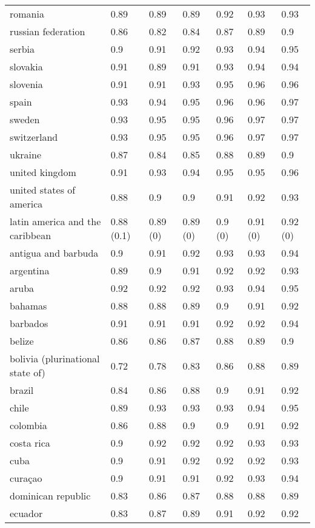 \begin{longtable}[t]{lllllll}
romania & 0.89 & 0.89 & 0.89 & 0.92 & 0.93 & 0.93\\
russian federation & 0.86 & 0.82 & 0.84 & 0.87 & 0.89 & 0.9\\
serbia & 0.9 & 0.91 & 0.92 & 0.93 & 0.94 & 0.95\\
slovakia & 0.91 & 0.89 & 0.91 & 0.93 & 0.94 & 0.94\\
slovenia & 0.91 & 0.91 & 0.93 & 0.95 & 0.96 & 0.96\\
\addlinespace
spain & 0.93 & 0.94 & 0.95 & 0.96 & 0.96 & 0.97\\
sweden & 0.93 & 0.95 & 0.95 & 0.96 & 0.97 & 0.97\\
switzerland & 0.93 & 0.95 & 0.95 & 0.96 & 0.97 & 0.97\\
ukraine & 0.87 & 0.84 & 0.85 & 0.88 & 0.89 & 0.9\\
united kingdom & 0.91 & 0.93 & 0.94 & 0.95 & 0.95 & 0.96\\
\addlinespace
united states of america & 0.88 & 0.9 & 0.9 & 0.91 & 0.92 & 0.93\\
latin america and the caribbean & 0.88 (0.1) & 0.89 (0) & 0.89 (0) & 0.9 (0) & 0.91 (0) & 0.92 (0)\\
antigua and barbuda & 0.9 & 0.91 & 0.92 & 0.93 & 0.93 & 0.94\\
argentina & 0.89 & 0.9 & 0.91 & 0.92 & 0.92 & 0.93\\
aruba & 0.92 & 0.92 & 0.92 & 0.93 & 0.94 & 0.95\\
\addlinespace
bahamas & 0.88 & 0.88 & 0.89 & 0.9 & 0.91 & 0.92\\
barbados & 0.91 & 0.91 & 0.91 & 0.92 & 0.92 & 0.94\\
belize & 0.86 & 0.86 & 0.87 & 0.88 & 0.89 & 0.9\\
bolivia (plurinational state of) & 0.72 & 0.78 & 0.83 & 0.86 & 0.88 & 0.89\\
brazil & 0.84 & 0.86 & 0.88 & 0.9 & 0.91 & 0.92\\
\addlinespace
chile & 0.89 & 0.93 & 0.93 & 0.93 & 0.94 & 0.95\\
colombia & 0.86 & 0.88 & 0.9 & 0.9 & 0.91 & 0.92\\
costa rica & 0.9 & 0.92 & 0.92 & 0.92 & 0.93 & 0.93\\
cuba & 0.9 & 0.91 & 0.92 & 0.92 & 0.92 & 0.93\\
curaçao & 0.9 & 0.91 & 0.91 & 0.92 & 0.93 & 0.94\\
\addlinespace
dominican republic & 0.83 & 0.86 & 0.87 & 0.88 & 0.88 & 0.89\\
ecuador & 0.83 & 0.87 & 0.89 & 0.91 & 0.92 & 0.92\\

\end{longtable}
